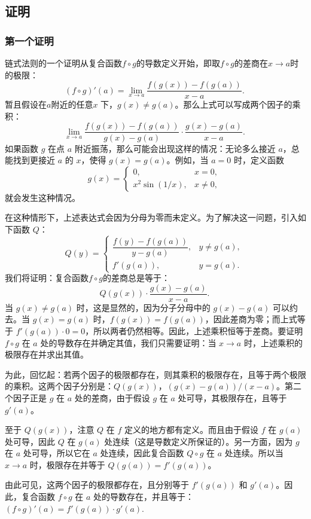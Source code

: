 \subsection{证明}
\subsubsection{第一个证明}
链式法则的一个证明从复合函数$f \circ g$的导数定义开始，即取$f \circ g$的差商在$x \to a$时的极限：
$$
(f \circ g)'(a) = \lim_{x \to a} \frac{f(g(x)) - f(g(a))}{x - a}.~
$$
暂且假设在$a$附近的任意$x$ 下，$g(x) \neq g(a)$。那么上式可以写成两个因子的乘积：
$$
\lim_{x \to a} \frac{f(g(x)) - f(g(a))}{g(x) - g(a)} \cdot \frac{g(x) - g(a)}{x - a}.~
$$
如果函数 $g$ 在点 $a$ 附近振荡，那么可能会出现这样的情况：无论多么接近 $a$，总能找到更接近 $a$ 的 $x$，使得 $g(x) = g(a)$。例如，当 $a=0$ 时，定义函数
$$
g(x) = \begin{cases}  
0, & x=0, \\  
x^2 \sin(1/x), & x \neq 0,  
\end{cases}~
$$
就会发生这种情况。

在这种情形下，上述表达式会因为分母为零而未定义。为了解决这一问题，引入如下函数 $Q$：
$$
Q(y) =  
\begin{cases}  
\dfrac{f(y) - f(g(a))}{y - g(a)}, & y \neq g(a), \\[2ex]  
f'(g(a)), & y = g(a).  
\end{cases}~  
$$
我们将证明：复合函数$f \circ g$的差商总是等于：
$$
Q(g(x)) \cdot \frac{g(x) - g(a)}{x - a}.~
$$
当 $g(x) \neq g(a)$ 时，这是显然的，因为分子分母中的 $g(x)-g(a)$ 可以约去。当 $g(x) = g(a)$ 时，$f(g(x)) = f(g(a))$，因此差商为零；而上式等于 $f'(g(a)) \cdot 0 = 0$，所以两者仍然相等。因此，上述乘积恒等于差商。要证明 $f \circ g$ 在 $a$ 处的导数存在并确定其值，我们只需要证明：当 $x \to a$ 时，上述乘积的极限存在并求出其值。

为此，回忆起：若两个因子的极限都存在，则其乘积的极限存在，且等于两个极限的乘积。这两个因子分别是：$Q(g(x))$，$(g(x)-g(a))/(x-a)$。第二个因子正是 $g$ 在 $a$ 处的差商，由于假设 $g$ 在 $a$ 处可导，其极限存在，且等于 $g'(a)$。

至于 $Q(g(x))$，注意 $Q$ 在 $f$ 定义的地方都有定义。而且由于假设 $f$ 在 $g(a)$ 处可导，因此 $Q$ 在 $g(a)$ 处连续（这是导数定义所保证的）。另一方面，因为 $g$ 在 $a$ 处可导，所以它在 $a$ 处连续，因此复合函数 $Q \circ g$ 在 $a$ 处连续。所以当 $x \to a$ 时，极限存在并等于 $Q(g(a)) = f'(g(a))$。

由此可见，这两个因子的极限都存在，且分别等于 $f'(g(a))$ 和 $g'(a)$。因此，复合函数 $f \circ g$ 在 $a$ 处的导数存在，并且等于：$(f \circ g)'(a) = f'(g(a)) \cdot g'(a)$.